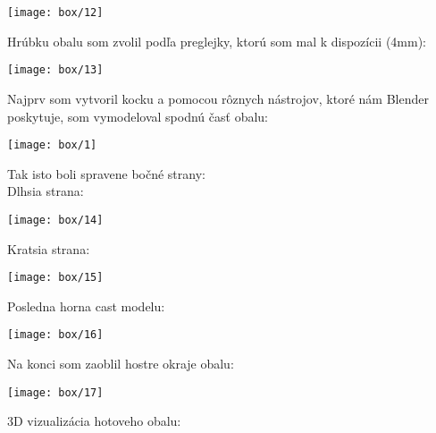         \begin{center}
          \texttt{[image: box/12]}
        \end{center}

        Hrúbku obalu som zvolil podľa preglejky, ktorú som mal k dispozícii (4mm): \\

        \begin{center}
          \texttt{[image: box/13]}
        \end{center}

        Najprv som vytvoril kocku a pomocou rôznych nástrojov, ktoré nám Blender poskytuje, som vymodeloval spodnú časť obalu: \\

        \begin{center}
          \texttt{[image: box/1]}
        \end{center}

        Tak isto boli spravene bočné strany: \\

        Dlhsia strana: \\

        \begin{center}
          \texttt{[image: box/14]} \\
        \end{center}

        Kratsia strana: \\

        \begin{center}
          \texttt{[image: box/15]}
        \end{center}

        Posledna horna cast modelu: \\

        \begin{center}
          \texttt{[image: box/16]}
        \end{center}

        Na konci som zaoblil hostre okraje obalu: \\

        \begin{center}
          \texttt{[image: box/17]}
        \end{center}

        3D vizualizácia hotoveho obalu: \\

